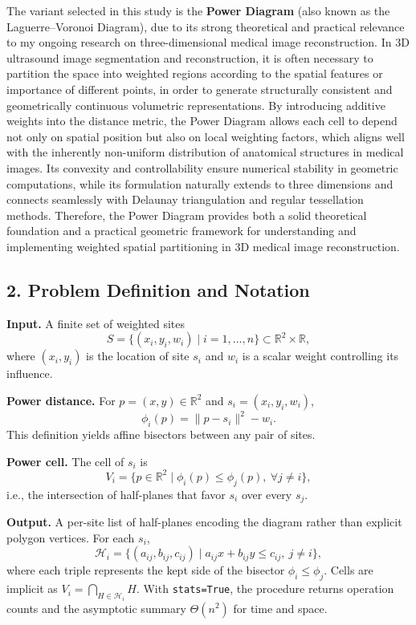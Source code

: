 \documentclass{article}
\begin{document}
The variant selected in this study is the \textbf{Power Diagram} (also known as the Laguerre–Voronoi Diagram), due to its strong theoretical and practical relevance to my ongoing research on three-dimensional medical image reconstruction.  
In 3D ultrasound image segmentation and reconstruction, it is often necessary to partition the space into weighted regions according to the spatial features or importance of different points, in order to generate structurally consistent and geometrically continuous volumetric representations.  
By introducing additive weights into the distance metric, the Power Diagram allows each cell to depend not only on spatial position but also on local weighting factors, which aligns well with the inherently non-uniform distribution of anatomical structures in medical images.  
Its convexity and controllability ensure numerical stability in geometric computations, while its formulation naturally extends to three dimensions and connects seamlessly with Delaunay triangulation and regular tessellation methods.  
Therefore, the Power Diagram provides both a solid theoretical foundation and a practical geometric framework for understanding and implementing weighted spatial partitioning in 3D medical image reconstruction.

\subsection*{2. Problem Definition and Notation}

\textbf{Input.}  
A finite set of weighted sites
\[
S=\{(x_i,y_i,w_i)\mid i=1,\dots,n\}\subset\mathbb{R}^2\times\mathbb{R},
\]
where $(x_i,y_i)$ is the location of site $s_i$ and $w_i$ is a scalar weight controlling its influence.

\textbf{Power distance.}  
For $p=(x,y)\in\mathbb{R}^2$ and $s_i=(x_i,y_i,w_i)$,
\[
\phi_i(p)=\|p-s_i\|^2-w_i .
\]
This definition yields affine bisectors between any pair of sites.

\textbf{Power cell.}  
The cell of $s_i$ is
\[
V_i=\{p\in\mathbb{R}^2\mid \phi_i(p)\le \phi_j(p),\ \forall j\neq i\},
\]
i.e., the intersection of half-planes that favor $s_i$ over every $s_j$.

\textbf{Output.}  
A per-site list of half-planes encoding the diagram rather than explicit polygon vertices.  
For each $s_i$,
\[
\mathcal{H}_i=\{(a_{ij},b_{ij},c_{ij})\mid a_{ij}x+b_{ij}y\le c_{ij},\ j\neq i\},
\]
where each triple represents the kept side of the bisector $\phi_i\le\phi_j$.  
Cells are implicit as $V_i=\bigcap_{H\in\mathcal{H}_i}H$.  
With \texttt{stats=True}, the procedure returns operation counts and the asymptotic summary $\Theta(n^2)$ for time and space.
\end{document}
